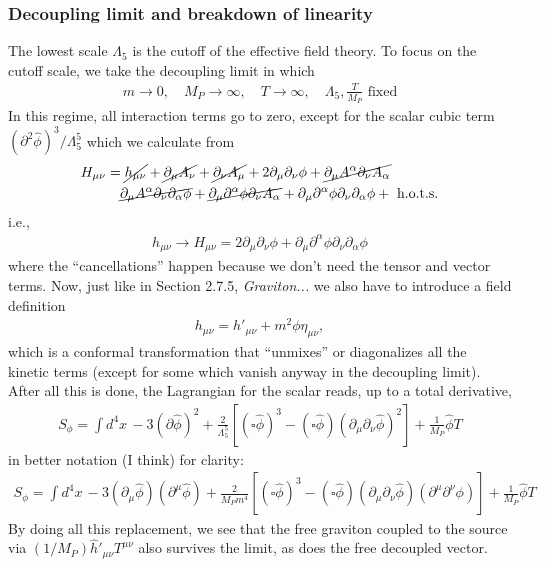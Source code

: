 \documentclass{book}
\theoremstyle{definition}
\newcommand{\p}{\partial}
\newcommand{\nn}{\nonumber}
\newcommand{\al}{\alpha}
\newcommand{\f}[2]{\frac{#1}{#2}}
\begin{document}
\newpage













\subsubsection{Decoupling limit and breakdown of linearity}


The lowest scale $\Lambda_5$ is the cutoff of the effective field theory. To focus on the cutoff scale, we take the decoupling limit in which 
\begin{align}
m \to 0, \quad M_P \to \infty, \quad T \to \infty, \quad \Lambda_5,\f{T}{M_P} \text{ fixed}
\end{align}
In this regime, all interaction terms go to zero, except for the scalar cubic term $(\p^2 \hat\phi)^3/\Lambda_5^5$ which we calculate from 
\begin{align}
H_{\mu\nu} &= \cancel{h_{\mu\nu}} + \cancel{\p_\mu A_\nu} + \cancel{\p_\nu A_\mu} + {2\p_\mu \p_\nu \phi} + \cancel{\p_\mu A^\al \p_\nu A_\al} \nn\\
&\quad \cancel{\p_\mu A^\al \p_\nu \p_\al \phi} + \cancel{\p_\mu\p^\al \phi \p_\nu A_\al} + \p_\mu \p^\al \phi \p_\nu \p_\al \phi + \text{ h.o.t.s.}
\end{align}
i.e.,
\begin{align}\label{replace}
\boxed{h_{\mu\nu} \to H_{\mu\nu} = 2\p_\mu \p_\nu \phi +\p_\mu \p^\al \phi \p_\nu \p_\al \phi}
\end{align}
where the ``cancellations'' happen because we don't need the tensor and vector terms. Now, just like in Section 2.7.5, \textit{Graviton...} we also have to introduce a field definition
\begin{align}
h_{\mu\nu} = h'_{\mu\nu} + m^2 \phi \eta_{\mu\nu},
\end{align}
which is a conformal transformation that ``unmixes'' or diagonalizes all the kinetic terms (except for some which vanish anyway in the decoupling limit).\\

After all this is done, the Lagrangian for the scalar reads, up to a total derivative,
\begin{align}\label{phi_lag}
\boxed{S_\phi = \int d^4x\, -3(\p \hat{\phi})^2 + \f{2}{\Lambda_5^5}[(\square \hat\phi)^3 - (\square \hat\phi)(\p_\mu \p_\nu \hat\phi)^2] + \f{1}{M_P}\hat\phi T}
\end{align}
in better notation (I think) for clarity:
\begin{align}
\boxed{S_\phi = \int d^4x\, -3(\p_\mu \hat{\phi})(\p^\mu \hat \phi) + \f{2}{M_P m^4}[(\square \hat\phi)^3 - (\square \hat\phi)(\p_\mu \p_\nu \hat\phi)(\p^\mu \p^\nu \phi)] + \f{1}{M_P}\hat\phi T}
\end{align}
By doing all this replacement, we see that the free graviton coupled to the source via $(1/M_P)\hat h'_{\mu\nu} T^{\mu\nu}$ also survives the limit, as does the free decoupled vector. \\
\end{document}
